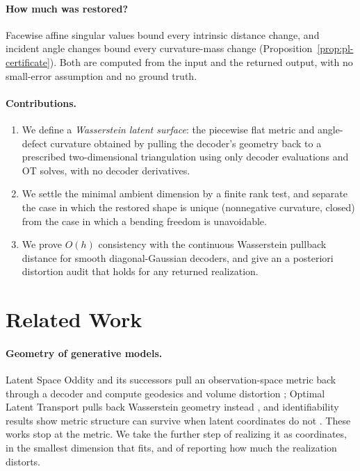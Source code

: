 \paragraph{How much was restored?}
Facewise affine singular values bound every intrinsic distance change, and
incident angle changes bound every curvature-mass change
(Proposition~\ref{prop:pl-certificate}).  Both are computed from the input and
the returned output, with no small-error assumption and no ground truth.

\paragraph{Contributions.}
\begin{enumerate}
  \item We define a \emph{Wasserstein latent surface}: the piecewise flat
  metric and angle-defect curvature obtained by pulling the decoder's geometry
  back to a prescribed two-dimensional triangulation using only decoder
  evaluations and OT solves, with no decoder derivatives.
  \item We settle the minimal ambient dimension by a finite rank test, and
  separate the case in which the restored shape is unique (nonnegative
  curvature, closed) from the case in which a bending freedom is unavoidable.
  \item We prove $O(h)$ consistency with the continuous Wasserstein pullback
  distance for smooth diagonal-Gaussian decoders, and give an a posteriori
  distortion audit that holds for any returned realization.
\end{enumerate}

\section{Related Work}

\paragraph{Geometry of generative models.}
Latent Space Oddity and its successors pull an observation-space metric back
through a decoder and compute geodesics and volume distortion
\cite{arvanitidis2018,chen2018,arvanitidis2022}; Optimal Latent Transport
pulls back Wasserstein geometry instead \cite{roy2022}, and identifiability
results show metric structure can survive when latent coordinates do not
\cite{syrota2025}.  These works stop at the metric.  We take the further step
of realizing it as coordinates, in the smallest dimension that fits, and of
reporting how much the realization distorts.

